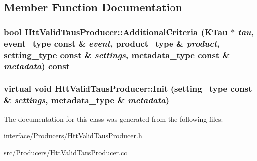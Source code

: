 \subsection{Member Function Documentation}
\hypertarget{classHttValidTausProducer_a6bc6b7b7c64dd16441e8f0b9a368d729}{
\subsubsection[{AdditionalCriteria}]{\setlength{\rightskip}{0pt plus 5cm}bool HttValidTausProducer::AdditionalCriteria (KTau $\ast$ {\em tau}, \/  {\bf event\_\-type} const \& {\em event}, \/  {\bf product\_\-type} \& {\em product}, \/  {\bf setting\_\-type} const \& {\em settings}, \/  {\bf metadata\_\-type} const \& {\em metadata}) const}}
\label{classHttValidTausProducer_a6bc6b7b7c64dd16441e8f0b9a368d729}
\hypertarget{classHttValidTausProducer_a42b501373453165f2a397c7d28b5409f}{
\subsubsection[{Init}]{\setlength{\rightskip}{0pt plus 5cm}virtual void HttValidTausProducer::Init ({\bf setting\_\-type} const \& {\em settings}, \/  {\bf metadata\_\-type} \& {\em metadata})}}
\label{classHttValidTausProducer_a42b501373453165f2a397c7d28b5409f}


The documentation for this class was generated from the following files:\begin{DoxyCompactItemize}
\item 
interface/Producers/\hyperlink{HttValidTausProducer_8h}{HttValidTausProducer.h}\item 
src/Producers/\hyperlink{HttValidTausProducer_8cc}{HttValidTausProducer.cc}\end{DoxyCompactItemize}

